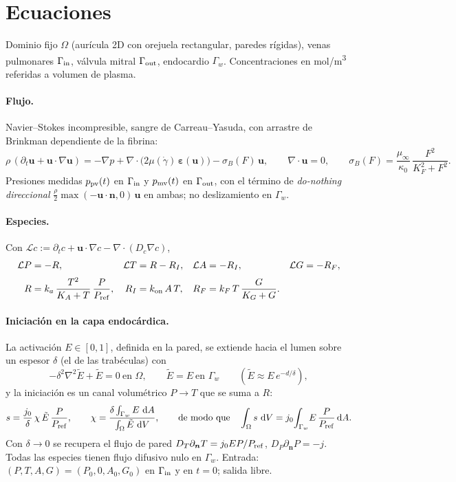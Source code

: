 \documentclass[11pt,a4paper]{article}
\newcommand{\dd}{\,\mathrm{d}}
\newcommand{\bu}{\bm{u}}
\newcommand{\bn}{\bm{n}}
\newcommand{\Lc}{\mathcal{L}}
\newcommand{\Pref}{P_{\rm ref}}
\begin{document}
\section{Ecuaciones}

Dominio fijo $\Omega$ (aurícula 2D con orejuela rectangular, paredes rígidas), venas pulmonares $\Gamma_{\rm in}$, válvula mitral $\Gamma_{\rm out}$, endocardio $\Gamma_w$. Concentraciones en \si{mol/m^3} referidas a volumen de plasma.

\paragraph{Flujo.} Navier--Stokes incompresible, sangre de Carreau--Yasuda, con arrastre de Brinkman dependiente de la fibrina:
\begin{equation}
\rho\,(\partial_t\bu+\bu\!\cdot\!\nabla\bu)=-\nabla p+\nabla\!\cdot\!\big(2\mu(\dot\gamma)\,\bm\varepsilon(\bu)\big)-\sigma_B(F)\,\bu,\qquad
\nabla\!\cdot\!\bu=0,\qquad
\sigma_B(F)=\frac{\mu_\infty}{\kappa_0}\,\frac{F^2}{K_F^2+F^2}.
\label{eq:ns}
\end{equation}
Presiones medidas $p_{\rm pv}(t)$ en $\Gamma_{\rm in}$ y $p_{\rm mv}(t)$ en $\Gamma_{\rm out}$, con el término de \emph{do-nothing direccional} $\tfrac{\rho}{2}\max(-\bu\!\cdot\!\bn,0)\,\bu$ en ambas; no deslizamiento en $\Gamma_w$.

\paragraph{Especies.} Con $\Lc c:=\partial_t c+\bu\!\cdot\!\nabla c-\nabla\!\cdot(D_c\nabla c)$,
\begin{align}
\Lc P &= -R, & \Lc T &= R-R_I, & \Lc A &= -R_I, & \Lc G &= -R_F,
\label{eq:pde}\\[2pt]
R &= k_a\,\frac{T^2}{K_A+T}\,\frac{P}{\Pref}, & R_I &= k_{\rm on}\,A\,T, & R_F &= k_F\,T\,\frac{G}{K_G+G}. &&
\label{eq:rates}
\end{align}

\paragraph{Iniciación en la capa endocárdica.} La activación $E\in[0,1]$, definida en la pared, se extiende hacia el lumen sobre un espesor $\delta$ (el de las trabéculas) con
\begin{equation}
-\delta^2\nabla^2\tilde E+\tilde E=0\ \text{en }\Omega,\qquad \tilde E=E\ \text{en }\Gamma_w
\qquad(\tilde E\approx E\,e^{-d/\delta}),
\label{eq:ext}
\end{equation}
y la iniciación es un canal volumétrico $P\to T$ que se suma a $R$:
\begin{equation}
s=\frac{j_0}{\delta}\,\chi\,\tilde E\,\frac{P}{\Pref},\qquad
\chi=\frac{\delta\int_{\Gamma_w}E\,\dd A}{\int_\Omega\tilde E\,\dd V},
\qquad\text{de modo que}\quad \int_\Omega s\,\dd V=j_0\!\int_{\Gamma_w}\!E\,\frac{P}{\Pref}\dd A .
\label{eq:bc}
\end{equation}
Con $\delta\to0$ se recupera el flujo de pared $D_T\partial_{\bn}T=j_0EP/\Pref$, $D_P\partial_{\bn}P=-j$. Todas las especies tienen flujo difusivo nulo en $\Gamma_w$. Entrada: $(P,T,A,G)=(P_0,0,A_0,G_0)$ en $\Gamma_{\rm in}$ y en $t=0$; salida libre.
\end{document}
